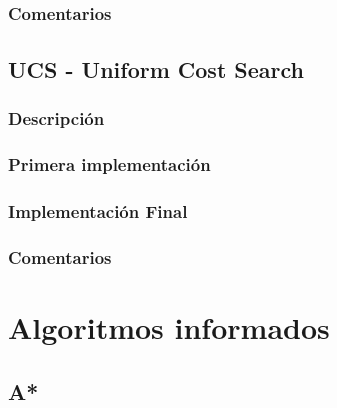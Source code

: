 \documentclass{report}
\begin{document}
          \paragraph*{}{

          }
        \subsection*{Comentarios}
      \clearpage\section{UCS - Uniform Cost Search}
        \subsection*{Descripción}
          \paragraph*{}{

          }
        \subsection*{Primera implementación}
          \paragraph*{}{

          }
        \subsection*{Implementación Final}
          \paragraph*{}{

          }
        \subsection*{Comentarios}
          \paragraph*{}{

          }
    \chapter{Algoritmos informados}
      \section{A*}
\end{document}
